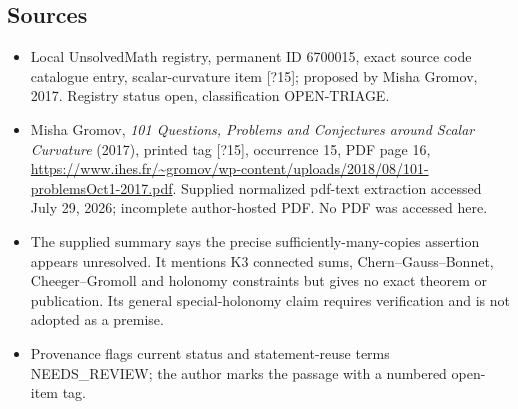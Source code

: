 \documentclass[11pt]{article}
\begin{document}
\subsection{Sources}
\begin{itemize}
\item Local UnsolvedMath registry, permanent ID 6700015, exact source code catalogue entry, scalar-curvature item [?15]; proposed by Misha Gromov, 2017. Registry status open, classification OPEN-TRIAGE.
\item Misha Gromov, \emph{101 Questions, Problems and Conjectures around Scalar Curvature} (2017), printed tag [?15], occurrence 15, PDF page 16, \url{https://www.ihes.fr/~gromov/wp-content/uploads/2018/08/101-problemsOct1-2017.pdf}. Supplied normalized pdf-text extraction accessed July 29, 2026; incomplete author-hosted PDF. No PDF was accessed here.
\item The supplied summary says the precise sufficiently-many-copies assertion appears unresolved. It mentions K3 connected sums, Chern--Gauss--Bonnet, Cheeger--Gromoll and holonomy constraints but gives no exact theorem or publication. Its general special-holonomy claim requires verification and is not adopted as a premise.
\item Provenance flags current status and statement-reuse terms NEEDS\_REVIEW; the author marks the passage with a numbered open-item tag.
\end{itemize}
\end{document}
